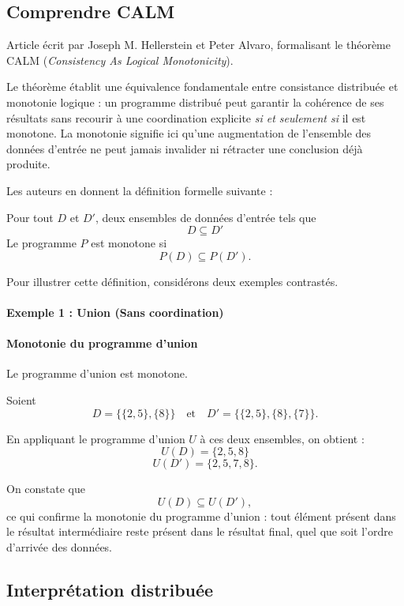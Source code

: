 \documentclass[12pt,a4paper]{article}
\begin{document}
\subsection{Comprendre CALM}

Article écrit par Joseph M. Hellerstein et Peter Alvaro, formalisant le théorème CALM
(\textit{Consistency As Logical Monotonicity}).

Le théorème établit une équivalence fondamentale entre consistance distribuée et monotonie
logique : un programme distribué peut garantir la cohérence de ses résultats sans recourir
à une coordination explicite \textit{si et seulement si} il est monotone. La monotonie
signifie ici qu'une augmentation de l'ensemble des données d'entrée ne peut jamais
invalider ni rétracter une conclusion déjà produite.

Les auteurs en donnent la définition formelle suivante :

Pour tout $D$ et $D'$, deux ensembles de données d'entrée tels que
\[
D \subseteq D'
\]
Le programme $P$ est monotone si
\[
P(D) \subseteq P(D').
\]

Pour illustrer cette définition, considérons deux exemples contrastés.

\paragraph{Exemple 1 : Union (Sans coordination)}

\paragraph{Monotonie du programme d'union}

Le programme d'union est monotone.

Soient
\[
D = \bigl\{ \{2,5\}, \{8\} \bigr\}
\quad \text{et} \quad
D' = \bigl\{ \{2,5\}, \{8\}, \{7\} \bigr\}.
\]

En appliquant le programme d'union $U$ à ces deux ensembles, on obtient :
\[
U(D) = \{2,5,8\}
\]
\[
U(D') = \{2,5,7,8\}.
\]

On constate que
\[
U(D) \subseteq U(D'),
\]
ce qui confirme la monotonie du programme d'union : tout élément présent dans le résultat
intermédiaire reste présent dans le résultat final, quel que soit l'ordre d'arrivée des données.

\subsection*{Interprétation distribuée}
\end{document}
